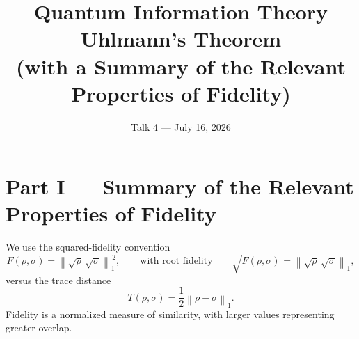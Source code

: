 \documentclass[11pt]{article}
\title{\textbf{Quantum Information Theory}\\[4pt]
Uhlmann's Theorem\\[2pt]
\large (with a Summary of the Relevant Properties of Fidelity)}
\author{}
\date{Talk 4 --- July 16, 2026}
\newcommand{\onenorm}[1]{\left\lVert #1 \right\rVert_{1}}
\begin{document}
\maketitle

\part*{Part I --- Summary of the Relevant Properties of Fidelity}

We use the squared-fidelity convention
\[
F(\rho,\sigma) = \onenorm{\sqrt{\rho}\,\sqrt{\sigma}}^{\,2},
\qquad\text{with root fidelity}\qquad
\sqrt{F(\rho,\sigma)} = \onenorm{\sqrt{\rho}\,\sqrt{\sigma}},
\]
versus the trace distance
\[
T(\rho,\sigma) = \frac12\onenorm{\rho-\sigma}.
\]
Fidelity is a normalized measure of similarity, with larger values representing
greater overlap.
\end{document}
